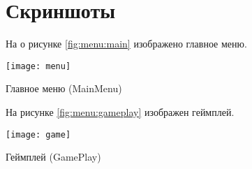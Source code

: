 \section{Скриншоты}

На о рисунке \ref{fig:menu:main} изображено главное меню.
\begin{image}
	\texttt{[image: menu]}
	\caption{Главное меню (MainMenu)}
	\label{fig:menu:main}
\end{image}

На рисунке \ref{fig:menu:gameplay} изображен геймплей.
\begin{image}
	\texttt{[image: game]}
	\caption{Геймплей (GamePlay)}
	\label{fig:menu:gameplay}
\end{image}

